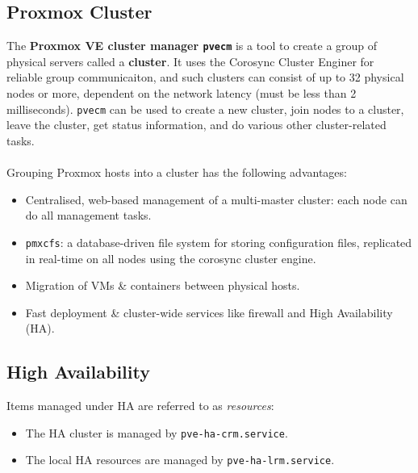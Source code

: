 \documentclass[a4paper,11pt]{article}
\begin{document}
\subsection{Proxmox Cluster}
The \textbf{Proxmox VE cluster manager \texttt{pvecm}} is a tool to create a group of physical servers called a \textbf{cluster}.
It uses the Corosync Cluster Enginer for reliable group communicaiton, and such clusters can consist of up to 32 physical nodes or more, dependent on the network latency (must be less than 2 milliseconds).
\verb|pvecm| can be used to create a new cluster, join nodes to a cluster, leave the cluster, get status information, and do various other cluster-related tasks.
\\\\
Grouping Proxmox hosts into a cluster has the following advantages:
\begin{itemize}
    \item   Centralised, web-based management of a multi-master cluster: each node can do all management tasks.
    \item   \verb|pmxcfs|: a database-driven file system for storing configuration files, replicated in real-time on all nodes using the corosync cluster engine.
    \item   Migration of VMs \& containers between physical hosts.
    \item   Fast deployment \& cluster-wide services like firewall and High Availability (HA).
\end{itemize}

\subsection{High Availability}
Items managed under HA are referred to as \textit{resources}:
\begin{itemize}
    \item   The HA cluster is managed by \verb|pve-ha-crm.service|.
    \item   The local HA resources are managed by \verb|pve-ha-lrm.service|.
\end{itemize}
\end{document}
